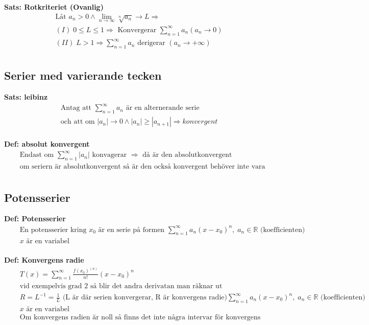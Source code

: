 \documentclass{article}
\begin{document}
\textbf{Sats: Rotkriteriet (Ovanlig)}
\begin{align*}
  &\quad  \text{Låt } a_n>0 \land \lim_{n\to{\infty}}\sqrt[n]{a_n} \to L \Rightarrow \\
  &\quad  (I) \; 0 \leq L \leq 1 \Rightarrow \text{ Konvergerar } \displaystyle\sum_{n=1}^{\infty}a_n
  (a_n \to 0) \\
  &\quad  (II) \; L>1 \Rightarrow \displaystyle\sum_{n=1}^{\infty}a_n \text{ derigerar }
  (a_n \to +\infty) \\
\end{align*}

\subsection{Serier med varierande tecken}
\textbf{Sats: leibinz}
\begin{align*}
  &\quad  \text{Antag att } \displaystyle\sum_{n=1}^{\infty}a_n \text{ är en alternerande serie } \\
  &\quad  \text{och att om } |a_n| \to 0 \land |a_n|\geq|a_{n+1}| \Rightarrow konvergent \\
\end{align*}

\textbf{Def: absolut konvergent}
\begin{align*}
  &\quad  \text{Endast om } \displaystyle\sum_{n=1}^{\infty}|a_n| \text{ konvagerar } \Rightarrow
  \text{ då är den absolutkonvergent} \\
  &\quad \text{om seriern är absolutkonvergent så är den också konvergent behöver inte vara tvärtom} \\
\end{align*}


\subsection{Potensserier}
\textbf{Def: Potensserier}
\begin{align*}
  &\quad  \text{En potensserier kring $x_0$ är en serie på formen }
  \displaystyle\sum_{n=1}^{\infty}a_n{(x-x_0)}^n, \; a_n \in \mathbb{R} \text{ (koefficienten)} \\
  &\quad  x \text{ är en variabel} \\
\end{align*}

\textbf{Def: Konvergens radie}
\begin{align*}
  &\quad  T(x)=\displaystyle\sum_{n=1}^{\infty}\frac{{f(x_0)}^{(n)}}{n!}{(x-x_0)}^n \\
  &\quad  \text{vid exempelvis grad 2 så blir det andra derivatan man räknar ut} \\
  &\quad  R=L^{-1}=\frac{1}{L} \text{ (L är där serien konvergerar, R är konvergens radie)}
  \displaystyle\sum_{n=1}^{\infty}a_n{(x-x_0)}^n, \; a_n \in \mathbb{R} \text{ (koefficienten)} \\
  &\quad  x \text{ är en variabel} \\
  &\quad  \text{Om konvergens radien är noll så finns det inte några intervar för konvergens eller divergens}
\end{align*}
\end{document}

